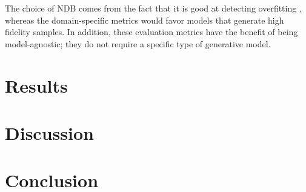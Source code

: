 The choice of NDB comes from the fact that it is good at detecting overfitting \parencite{borji_pros_2018}, whereas the domain-specific metrics would favor models that generate high fidelity samples. In addition, these evaluation metrics have the benefit of being model-agnostic; they do not require a specific type of generative model.

\chapter{Results}

\chapter{Discussion}

\chapter{Conclusion}

\printbibliography

%

